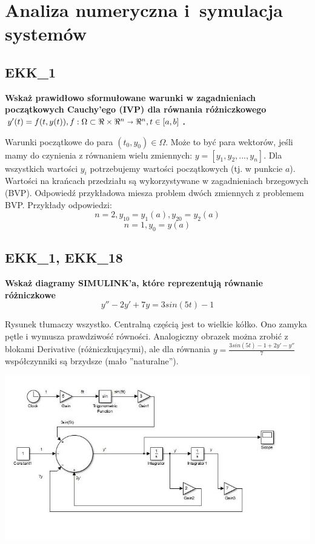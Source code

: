 \chapter{Analiza numeryczna i~symulacja systemów}
\PartialToc
\section{EKK\_1}
\textbf{Wskaż prawidłowo sformułowane warunki w zagadnieniach początkowych Cauchy'ego (IVP) dla równania różniczkowego $y'(t) = f(t, y(t)), f: \Omega \subset \Re \times \Re^{n} \shortrightarrow \Re^{n}, t \in [a, b]$.}

\vspace{0.4cm}
\noindent  Warunki początkowe do para $(t_0, y_0) \in \Omega$. Może to być para wektorów, jeśli mamy do czynienia z równaniem wielu zmiennych: $y=[y_1, y_2, ..., y_n]$. Dla wszystkich wartości $y_i$ potrzebujemy wartości początkowych (tj. w punkcie $a$). Wartości na krańcach przedziału są wykorzystywane w zagadnieniach brzegowych (BVP). Odpowiedź przykładowa miesza problem dwóch zmiennych z problemem BVP. 
Przykłady odpowiedzi:
$$n=2, y_{10}=y_1(a), y_{20}=y_2(a)$$
$$n=1, y_0=y(a)$$


\section{EKK\_1, EKK\_18}
\textbf{Wskaż diagramy SIMULINK'a, które reprezentują równanie różniczkowe $$y''-2y'+7y=3sin(5t)-1$$}

\vspace{0.4cm}
\noindent Rysunek tłumaczy wszystko. Centralną częścią jest to wielkie kółko. Ono zamyka pętle i wymusza prawdziwość równości. Analogiczny obrazek można zrobić z blokami Derivative (różniczkującymi), ale dla równania $y=\frac{3sin(5t)-1+2y'-y''}{7}$ współczynniki są brzydsze (mało ''naturalne'').
\begin{center}
\includegraphics[width=15cm]{08/simulink}
\end{center}
\newpage
